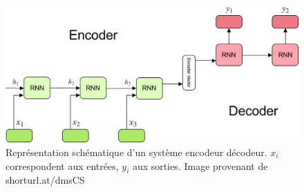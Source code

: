 \begin{figure}[h]
  \centering
  \includegraphics[width=14cm]{./Chapitre3/figures/encoder.jpeg}
  \caption{Représentation schématique d'un système encodeur décodeur. $x_i$ correspondent aux entrées, $y_i$ aux sorties. Image provenant de shorturl.at/dmsCS}
  \label{fig:encoder}
\end{figure}
